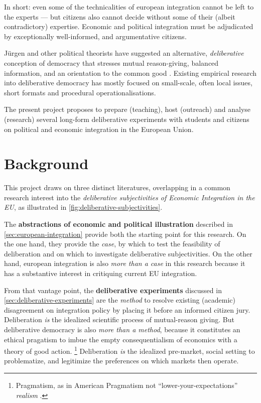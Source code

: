 \documentclass[11pt,a4paper,oneside,english]{article}
\begin{document}
In short:
even some of the technicalities of european integration cannot be left to the experts --- but citizens also cannot decide without some of their (albeit contradictory) expertise.
Economic and political integration must be adjudicated by exceptionally well-informed, and argumentative citizens.

Jürgen \textcite{Habermas1988a} and other political theorists have suggested an alternative, \emph{deliberative} conception of democracy that stresses mutual reason-giving, balanced information, and an orientation to the common good \parencite{Rawls-1971,Cohen-1989-aa}.
Existing empirical research into deliberative democracy has mostly focused on small-scale, often local issues, short formats and procedural operationalisations.

The present project proposes to prepare (teaching), host (outreach) and analyse (research) several long-form deliberative experiments with students and citizens on political and economic integration in the European Union.


\section[Background]{Background} \label{sec:background}

This project draws on three distinct literatures, overlapping in a common research interest into the \emph{deliberative subjectivities of Economic Integration in the EU}, as illustrated in \autoref{fig:deliberative-subjectivities}.

The \textbf{abstractions of economic and political illustration} described in \autoref{sec:european-integration} provide both the starting point for this research.
On the one hand, they provide the \emph{case}, by which to test the feasibility of deliberation and on which to investigate deliberative subjectivities.
On the other hand, european integration is also \emph{more than a case} in this research because it has a substantive interest in critiquing current EU integration.

From that vantage point, the \textbf{deliberative experiments} discussed in \autoref{sec:deliberative-experiments} are the \emph{method} to resolve existing (academic) disagreement on integration policy by placing it before an informed citizen jury.
Deliberation \emph{is} the idealized scientific process of mutual-reason giving.
But deliberative democracy is also \emph{more than a method}, because it constitutes an ethical pragatism to imbue the empty consequentialism of economics with a theory of good action.
\footnote{
	Pragmatism, as in American Pragmatism \parencite{Dewey1932,Mead-1925-aa,Pierson1992} not ``lower-your-expectations'' \emph{realism} \parencite{Neiman-2008}.
}
Deliberation \emph{is} the idealized pre-market, social setting to problematize, and legitimize the preferences on which markets then operate.
\end{document}
